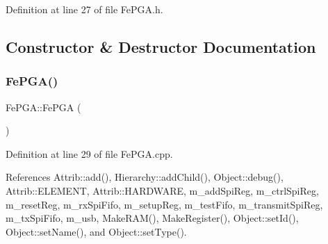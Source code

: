 Definition at line 27 of file Fe\+P\+G\+A.\+h.



\subsection{Constructor \& Destructor Documentation}
\mbox{\label{classFePGA_a377ae8860fbb3162e0c49dd08197a670}} 
\subsubsection{\texorpdfstring{Fe\+P\+G\+A()}{FePGA()}}
{\footnotesize\ttfamily Fe\+P\+G\+A\+::\+Fe\+P\+GA (\begin{DoxyParamCaption}{ }\end{DoxyParamCaption})}



Definition at line 29 of file Fe\+P\+G\+A.\+cpp.



References Attrib\+::add(), Hierarchy\+::add\+Child(), Object\+::debug(), Attrib\+::\+E\+L\+E\+M\+E\+NT, Attrib\+::\+H\+A\+R\+D\+W\+A\+RE, m\+\_\+add\+Spi\+Reg, m\+\_\+ctrl\+Spi\+Reg, m\+\_\+reset\+Reg, m\+\_\+rx\+Spi\+Fifo, m\+\_\+setup\+Reg, m\+\_\+test\+Fifo, m\+\_\+transmit\+Spi\+Reg, m\+\_\+tx\+Spi\+Fifo, m\+\_\+usb, Make\+R\+A\+M(), Make\+Register(), Object\+::set\+Id(), Object\+::set\+Name(), and Object\+::set\+Type().


